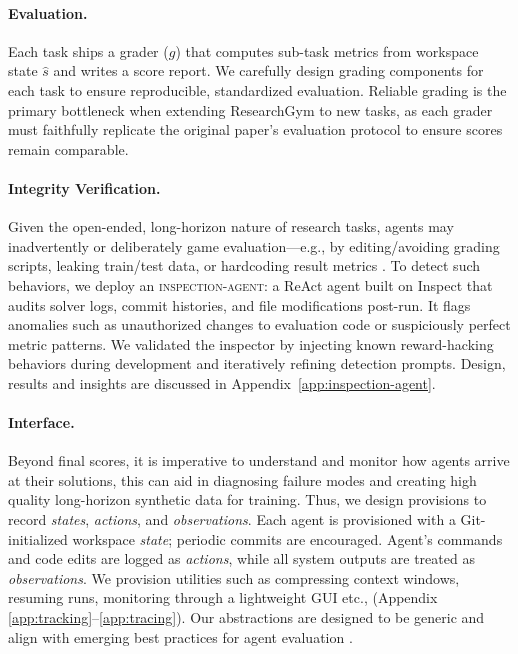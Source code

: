 \documentclass[11pt]{article}
\let\cite\citep
\newcommand{\kw}[1]{{\textsc{\MakeLowercase{#1}}}}
\theoremstyle{plain}
\theoremstyle{definition}
\theoremstyle{remark}
\begin{document}
\paragraph{Evaluation.}
Each task ships a grader ($g$) that computes sub-task metrics from workspace state $\hat{s}$ and writes a score report. We carefully design grading components for each task to ensure reproducible, standardized evaluation. 
Reliable grading is the primary bottleneck when extending ResearchGym to new tasks, as each grader must faithfully replicate the original paper's evaluation protocol to ensure scores remain comparable.

\paragraph{Integrity Verification.}
Given the open-ended, long-horizon nature of research tasks, agents may inadvertently or deliberately game evaluation—e.g., by editing/avoiding grading scripts, leaking train/test data, or hardcoding result metrics \citep{anthropic2025claude}. To detect such behaviors, we deploy an \kw{inspection-agent}: a ReAct agent built on Inspect \cite{UK_AI_Security_Institute_Inspect_AI_Framework_2024} that audits solver logs, commit histories, and file modifications post-run. It flags anomalies such as unauthorized changes to evaluation code or suspiciously perfect metric patterns. We validated the inspector by injecting known reward-hacking behaviors during development and iteratively refining detection prompts. Design, results and insights are discussed in Appendix~\ref{app:inspection-agent}.

\paragraph{Interface.}
Beyond final scores, it is imperative to understand and monitor how agents arrive at their solutions, this can aid in diagnosing failure modes and creating high quality long-horizon synthetic data for training. Thus, we design provisions to
record \emph{states}, \emph{actions}, and \emph{observations}. 
Each agent is provisioned with a Git-initialized workspace \emph{state}; periodic commits are encouraged.
Agent's commands and code edits are logged as \emph{actions}, while all system outputs are treated as \emph{observations}. 
We provision utilities such as compressing context windows, resuming runs, monitoring through a lightweight GUI etc., (Appendix \ref{app:tracking}--\ref{app:tracing}). 
Our abstractions are designed to be generic and align with emerging best practices for agent evaluation \cite{grace2026demystifying}.
\end{document}

